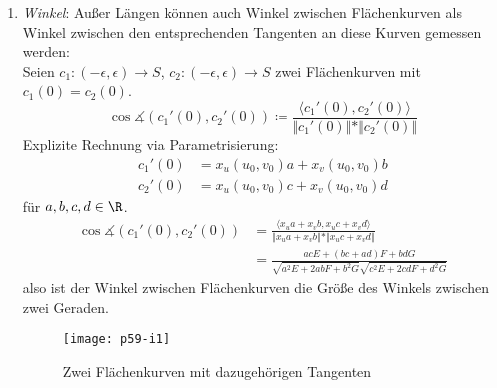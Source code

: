 \begin{remark}
\begin{enumerate}
  \item \emph{Winkel}: Außer Längen können auch Winkel zwischen Flächenkurven als Winkel zwischen den entsprechenden Tangenten an diese Kurven gemessen werden: \\
  Seien $ c_1: (-\epsilon, \epsilon) \to S $, $ c_2: (-\epsilon, \epsilon) \to S $ zwei Flächenkurven mit $ c_1(0) = c_2(0) $.
  \begin{equation*}
    \cos \measuredangle (c_1'(0),c_2'(0)) \coloneqq \frac{\langle c_1'(0), c_2'(0) \rangle}{\Vert c_1'(0) \Vert * \Vert c_2'(0) \Vert}
  \end{equation*}
  Explizite Rechnung via Parametrisierung:
  \begin{align*}
    c_1'(0) &= x_u(u_0, v_0)a + x_v(u_0,v_0)b \\
    c_2'(0) &= x_u(u_0, v_0)c + x_v(u_0,v_0)d
  \end{align*}
  für $ a,b,c,d \in \R $.
  \begin{align*}
    \cos \measuredangle (c_1'(0), c_2'(0)) &= \frac{\langle x_ua + x_vb, x_uc + x_vd \rangle}{\Vert x_ua + x_vb \Vert * \Vert x_uc + x_vd \Vert} \\
     &= \frac{acE + (bc + ad)F + bdG}{\sqrt{a^2E + 2abF + b^2G}\sqrt{c^2E + 2cdF + d^2G}}
  \end{align*}
  also ist der Winkel zwischen Flächenkurven die Größe des Winkels zwischen zwei Geraden.

  \begin{figure}[H]
    \texttt{[image: p59-i1]}
    \caption{Zwei Flächenkurven mit dazugehörigen Tangenten}
  \end{figure}


\end{enumerate}
\end{remark}
